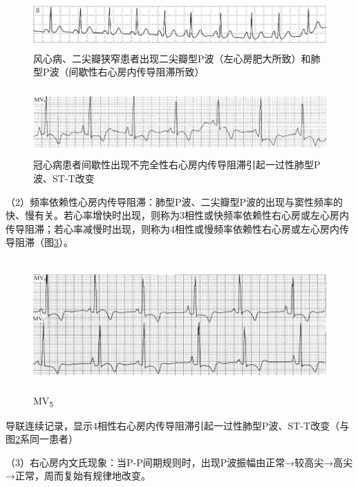 \begin{figure}[!htbp]
 \centering
 \includegraphics[width=5.82292in,height=0.72917in]{./images/Image00012.jpg}
 \captionsetup{justification=centering}
 \caption{风心病、二尖瓣狭窄患者出现二尖瓣型P波（左心房肥大所致）和肺型P波（间歇性右心房内传导阻滞所致）}
 \label{fig1-7}
  \end{figure} 

\begin{figure}[!htbp]
 \centering
 \includegraphics[width=5.78125in,height=1in]{./images/Image00013.jpg}
 \captionsetup{justification=centering}
 \caption{冠心病患者间歇性出现不完全性右心房内传导阻滞引起一过性肺型P波、ST-T改变}
 \label{fig1-8}
  \end{figure} 

（2）频率依赖性心房内传导阻滞：肺型P波、二尖瓣型P波的出现与窦性频率的快、慢有关。若心率增快时出现，则称为3相性或快频率依赖性右心房或左心房内传导阻滞；若心率减慢时出现，则称为4相性或慢频率依赖性右心房或左心房内传导阻滞（图\ref{fig1-9}）。

\begin{figure}[!htbp]
 \centering
 \includegraphics[width=5.78125in,height=1.97917in]{./images/Image00014.jpg}
 \captionsetup{justification=centering}
 \caption{MV\textsubscript{5}}
 \label{fig1-9}
  \end{figure} 
导联连续记录，显示4相性右心房内传导阻滞引起一过性肺型P波、ST-T改变（与图\ref{fig1-8}系同一患者）

（3）右心房内文氏现象：当P-P间期规则时，出现P波振幅由正常→较高尖→高尖→正常，周而复始有规律地改变。

